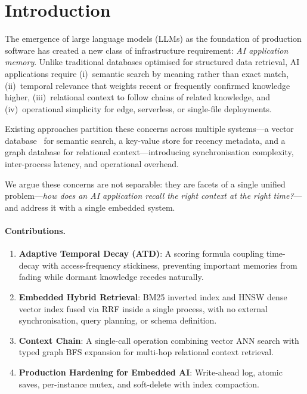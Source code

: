 \documentclass[11pt,twocolumn]{article}
\begin{document}
\section{Introduction}
\label{sec:intro}

The emergence of large language models (LLMs) as the foundation of production
software has created a new class of infrastructure requirement: \emph{AI application
memory}. Unlike traditional databases optimised for structured data retrieval, AI
applications require (i)~semantic search by meaning rather than exact match,
(ii)~temporal relevance that weights recent or frequently confirmed knowledge
higher, (iii)~relational context to follow chains of related knowledge, and
(iv)~operational simplicity for edge, serverless, or single-file deployments.

Existing approaches partition these concerns across multiple systems---a vector
database~\citep{pinecone2021,chroma2022,weaviate2021} for semantic search, a
key-value store for recency metadata, and a graph database for relational
context---introducing synchronisation complexity, inter-process latency, and
operational overhead.

We argue these concerns are not separable: they are facets of a single unified
problem---\emph{how does an AI application recall the right context at the right
time?}---and address it with a single embedded system.

\paragraph{Contributions.}
\begin{enumerate}[leftmargin=*,itemsep=2pt]
  \item \textbf{Adaptive Temporal Decay (ATD)}: A scoring formula coupling
        time-decay with access-frequency stickiness, preventing important memories
        from fading while dormant knowledge recedes naturally.
  \item \textbf{Embedded Hybrid Retrieval}: BM25 inverted index and HNSW dense
        vector index fused via RRF inside a single process, with no external
        synchronisation, query planning, or schema definition.
  \item \textbf{Context Chain}: A single-call operation combining vector ANN search
        with typed graph BFS expansion for multi-hop relational context retrieval.
  \item \textbf{Production Hardening for Embedded AI}: Write-ahead log, atomic saves,
        per-instance mutex, and soft-delete with index compaction.
\end{enumerate}
\end{document}

